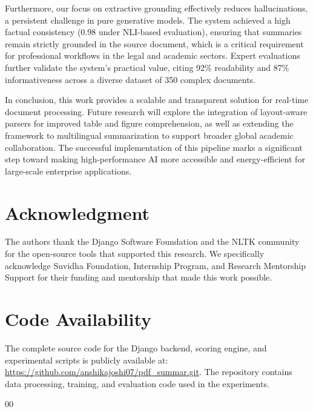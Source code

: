 \documentclass[conference]{IEEEtran}
\begin{document}
\begin{itemize}
Furthermore, our focus on extractive grounding effectively reduces hallucinations\cite{14}, a persistent challenge in pure generative models. The system achieved a high factual consistency (0.98 under NLI-based evaluation), ensuring that summaries remain strictly grounded in the source document\cite{14}, which is a critical requirement for professional workflows in the legal and academic sectors\cite{9}. Expert evaluations further validate the system's practical value, citing 92\% readability and 87\% informativeness across a diverse dataset of 350 complex documents\cite{19}.

In conclusion, this work provides a scalable and transparent solution for real-time document processing\cite{13, 16}. Future research will explore the integration of layout-aware parsers for improved table and figure comprehension\cite{23}, as well as extending the framework to multilingual summarization to support broader global academic collaboration\cite{4, 24}. The successful implementation of this pipeline marks a significant step toward making high-performance AI more accessible and energy-efficient for large-scale enterprise applications\cite{16}.



\section*{Acknowledgment}
The authors thank the Django Software Foundation and the NLTK community for the open-source tools that supported this research. We specifically acknowledge Suvidha Foundation, Internship Program, and Research Mentorship Support for their funding and mentorship that made this work possible.

\section*{Code Availability}
The complete source code for the Django backend, scoring engine, and experimental scripts is publicly available at: \url{https://github.com/anshikajoshi07/pdf_summar.git}. The repository contains data processing, training, and evaluation code used in the experiments.

\begin{thebibliography}{00}


\end{thebibliography}
\end{itemize}
\end{document}
